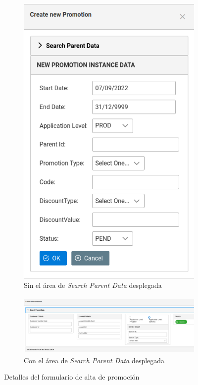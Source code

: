 \begin{description}
\begin{figure}
  \centering
  \begin{subfigure}[b]{0.35\textwidth}
    \includegraphics[width=\textwidth]{imaxes/formulario-alta-promocion-01.png}
    \caption{Sin el área de \emph{Search Parent Data} desplegada}
    \label{fig:formulario-alta-promocion-01}
  \end{subfigure}
  \begin{subfigure}[b]{0.64\textwidth}
    \includegraphics[width=\textwidth,height=3cm]{imaxes/formulario-alta-promocion-02.png}
    \caption{Con el área de \emph{Search Parent Data} desplegada}
    \label{fig:formulario-alta-promocion-02}
  \end{subfigure}
  \caption{Detalles del formulario de alta de promoción}
  \label{fig:alta-promocion}
\end{figure}



\end{description}
